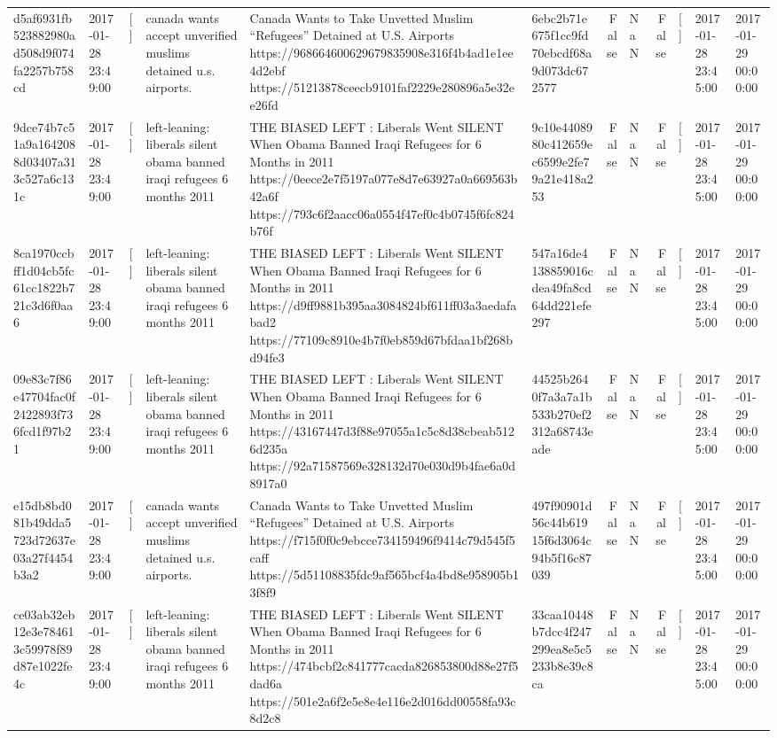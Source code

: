 \begin{tabular}{llllllrlrlll}
d5af6931fb523882980ad508d9f074fa2257b758cd & 2017-01-28 23:49:00 & [] & canada wants accept unverified muslims detained u.s. airports. & Canada Wants to Take Unvetted Muslim “Refugees” Detained at U.S. Airports https://968664600629679835908e316f4b4ad1e1ee4d2ebf https://51213878ceecb9101faf2229e280896a5e32ee26fd & 6ebc2b71e675f1cc9fd70ebcdf68a9d073dc672577 & False & NaN & False & [] & 2017-01-28 23:45:00 & 2017-01-29 00:00:00 \\
9dce74b7c51a9a1642088d03407a313c527a6c131c & 2017-01-28 23:49:00 & [] & left-leaning: liberals silent obama banned iraqi refugees 6 months 2011 & THE BIASED LEFT : Liberals Went SILENT When Obama Banned Iraqi Refugees for 6 Months in 2011 https://0eece2e7f5197a077e8d7e63927a0a669563b42a6f https://793c6f2aacc06a0554f47ef0c4b0745f6fc824b76f & 9c10e4408980c412659ec6599e2fe79a21e418a253 & False & NaN & False & [] & 2017-01-28 23:45:00 & 2017-01-29 00:00:00 \\
8ca1970ccbff1d04cb5fc61cc1822b721c3d6f0aa6 & 2017-01-28 23:49:00 & [] & left-leaning: liberals silent obama banned iraqi refugees 6 months 2011 & THE BIASED LEFT : Liberals Went SILENT When Obama Banned Iraqi Refugees for 6 Months in 2011 https://d9ff9881b395aa3084824bf611ff03a3aedafabad2 https://77109c8910e4b7f0eb859d67bfdaa1bf268bd94fe3 & 547a16de4138859016cdea49fa8cd64dd221efe297 & False & NaN & False & [] & 2017-01-28 23:45:00 & 2017-01-29 00:00:00 \\
09e83c7f86e47704fac0f2422893f736fcd1f97b21 & 2017-01-28 23:49:00 & [] & left-leaning: liberals silent obama banned iraqi refugees 6 months 2011 & THE BIASED LEFT : Liberals Went SILENT When Obama Banned Iraqi Refugees for 6 Months in 2011 https://43167447d3f88e97055a1c5c8d38cbeab5126d235a https://92a71587569e328132d70e030d9b4fae6a0d8917a0 & 44525b2640f7a3a7a1b533b270ef2312a68743eade & False & NaN & False & [] & 2017-01-28 23:45:00 & 2017-01-29 00:00:00 \\
e15db8bd081b49dda5723d72637e03a27f4454b3a2 & 2017-01-28 23:49:00 & [] & canada wants accept unverified muslims detained u.s. airports. & Canada Wants to Take Unvetted Muslim “Refugees” Detained at U.S. Airports https://f715f0f0c9ebcce734159496f9414c79d545f5caff https://5d51108835fdc9af565bcf4a4bd8e958905b13f8f9 & 497f90901d56c44b61915f6d3064c94b5f16c87039 & False & NaN & False & [] & 2017-01-28 23:45:00 & 2017-01-29 00:00:00 \\
ce03ab32eb12e3e784613c59978f89d87e1022fe4c & 2017-01-28 23:49:00 & [] & left-leaning: liberals silent obama banned iraqi refugees 6 months 2011 & THE BIASED LEFT : Liberals Went SILENT When Obama Banned Iraqi Refugees for 6 Months in 2011 https://474bcbf2c841777cacda826853800d88e27f5dad6a https://501e2a6f2e5e8e4e116e2d016dd00558fa93c8d2c8 & 33caa10448b7dcc4f247299ea8e5c5233b8e39c8ca & False & NaN & False & [] & 2017-01-28 23:45:00 & 2017-01-29 00:00:00 \\

\end{tabular}
